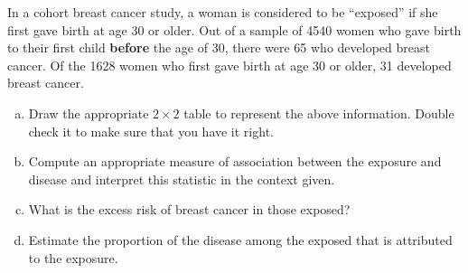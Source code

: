 In a cohort breast cancer study, a woman is considered to be ``exposed'' if she first gave birth at age 30 or older.  Out of a sample of 4540 women who gave birth to their first child {\bf before} the age of 30, there were 65 who developed breast cancer.  Of the 1628 women who first gave birth at age 30 or older, 31 developed breast cancer.

\begin{enumerate}[(a)]

\item Draw the appropriate $2\times 2$ table to represent the above information.  Double check it to make sure that you have it right.

\item Compute an appropriate measure of association between the exposure and disease and interpret this statistic in the context given.

\answerSpace{1in}

\item What is the excess risk of breast cancer in those exposed?
\answerSpace{1in}

\item Estimate the proportion of the disease among the exposed that is attributed to the exposure.

\answerSpace{1in}

\end{enumerate}
